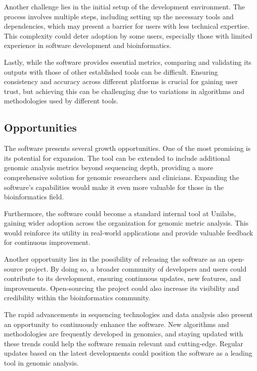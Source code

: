 Another challenge lies in the initial setup of the development environment. The process involves multiple steps, including setting up the necessary tools and dependencies, which may present a barrier for users with less technical expertise. This complexity could deter adoption by some users, especially those with limited experience in software development and bioinformatics.

Lastly, while the software provides essential metrics, comparing and validating its outputs with those of other established tools can be difficult. Ensuring consistency and accuracy across different platforms is crucial for gaining user trust, but achieving this can be challenging due to variations in algorithms and methodologies used by different tools.


\subsection{Opportunities}

The software presents several growth opportunities. One of the most promising is its potential for expansion. The tool can be extended to include additional genomic analysis metrics beyond sequencing depth, providing a more comprehensive solution for genomic researchers and clinicians. Expanding the software's capabilities would make it even more valuable for those in the bioinformatics field.

Furthermore, the software could become a standard internal tool at Unilabs, gaining wider adoption across the organization for genomic metric analysis. This would reinforce its utility in real-world applications and provide valuable feedback for continuous improvement.

Another opportunity lies in the possibility of releasing the software as an open-source project. By doing so, a broader community of developers and users could contribute to its development, ensuring continuous updates, new features, and improvements. Open-sourcing the project could also increase its visibility and credibility within the bioinformatics community.

The rapid advancements in sequencing technologies and data analysis also present an opportunity to continuously enhance the software. New algorithms and methodologies are frequently developed in genomics, and staying updated with these trends could help the software remain relevant and cutting-edge. Regular updates based on the latest developments could position the software as a leading tool in genomic analysis.

